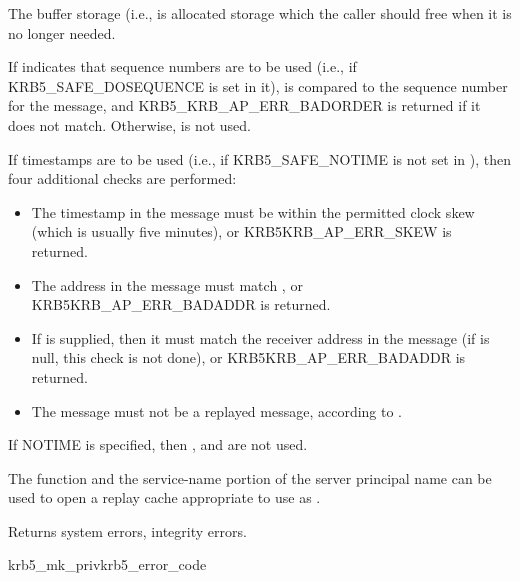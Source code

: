 The  buffer storage (i.e.,
 is allocated storage which the caller
should free when it is no longer needed.

If  indicates that sequence numbers are to be
used (i.e., if KRB5_SAFE_DOSEQUENCE is set in it),
 is compared to the sequence number for the
message, and KRB5_KRB_AP_ERR_BADORDER is returned if it does not
match.  Otherwise,  is not used.

If timestamps are to be used (i.e., if KRB5_SAFE_NOTIME is not set in
), then four additional checks are performed:
\begin{itemize}
\item The timestamp in the message must be within the permitted clock
	skew (which is usually five minutes), or KRB5KRB_AP_ERR_SKEW
	is returned.
\item The address in the message must match ,
	or KRB5KRB_AP_ERR_BADADDR is returned.
\item If  is supplied, then it must match
	the receiver address in the message (if 
	is null, this check is not done), or KRB5KRB_AP_ERR_BADADDR is
	returned.
\item The message must not be a replayed message, according to
	.
\end{itemize}
If NOTIME is specified, then ,
 and  are not used.


The function  and the service-name
portion of the server principal name can be used to open a
replay cache appropriate to use as .

Returns system errors, integrity errors.

\begin{funcdecl}{krb5_mk_priv}{krb5_error_code}{\funcin}
\funcinout
{}
\funcout
{}
\end{funcdecl}

